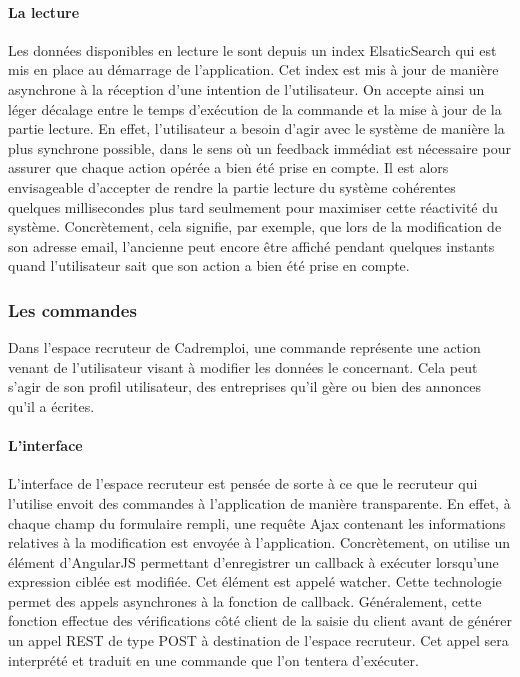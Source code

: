 \paragraph{La lecture}
\label{par:La lecture}
Les données disponibles en lecture le sont depuis un index ElsaticSearch qui est mis en place au démarrage de l'application.
Cet index est mis à jour de manière asynchrone à la réception d'une intention de l'utilisateur.
On accepte ainsi un léger décalage entre le temps d'exécution de la commande et la mise à jour de la partie lecture.
En effet, l'utilisateur a besoin d'agir avec le système de manière la plus synchrone possible, dans le sens où un feedback immédiat est nécessaire pour assurer que chaque action opérée a bien été prise en compte.
Il est alors envisageable d'accepter de rendre la partie lecture du système cohérentes quelques millisecondes plus tard seulmement pour maximiser cette réactivité du système.
Concrètement, cela signifie, par exemple, que lors de la modification de son adresse email, l'ancienne peut encore être affiché pendant quelques instants quand l'utilisateur sait que son action a bien été prise en compte.

\subsubsection{Les commandes}
\label{subs:Les commandes}
Dans l'espace recruteur de Cadremploi, une commande représente une action venant de l'utilisateur visant à modifier les données le concernant.
Cela peut s'agir de son profil utilisateur, des entreprises qu'il gère ou bien des annonces qu'il a écrites.
\paragraph{L'interface}
\label{par:L'interface}
L'interface de l'espace recruteur est pensée de sorte à ce que le recruteur qui l'utilise envoit des commandes à l'application de manière transparente.
En effet, à chaque champ du formulaire rempli, une requête Ajax contenant les informations relatives à la modification est envoyée à l'application.
Concrètement, on utilise un élément d'AngularJS permettant d'enregistrer un callback à exécuter lorsqu'une expression ciblée est modifiée.
Cet élément est appelé watcher.
Cette technologie permet des appels asynchrones à la fonction de callback.
Généralement, cette fonction effectue des vérifications côté client de la saisie du client avant de générer un appel REST de type POST à destination de l'espace recruteur.
Cet appel sera interprété et traduit en une commande que l'on tentera d'exécuter.

